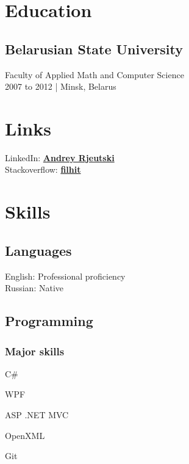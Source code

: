 \documentclass[a4paper,11pt]{article}
\newcommand{\periodandlocation}[1]{{\small #1}}
\begin{document}
  \vspace{1cm}
  \begin{minipage}[t]{0.34\textwidth}
    \section*{Education} 
    \subsection*{Belarusian State University}
    Faculty of Applied Math and Computer Science\\
	\periodandlocation{2007 to 2012 | Minsk, Belarus}
    \section*{Links} 
    LinkedIn: \href{https://linkedin.com/in/andrey-rjeutski-92064741}{\bf Andrey Rjeutski} \\
    Stackoverflow: \href{http://stackoverflow.com/users/3506292/filhit}{\bf filhit}
    \section*{Skills}
	\subsection*{Languages}
    English: Professional proficiency\\
    Russian: Native
    \subsection*{Programming}
    \subsubsection*{Major skills}
	\begin{inparaitem}
      \item C\# 
	  \item WPF
	  \item ASP .NET MVC
	  \item OpenXML
	  \item Git
	\end{inparaitem}

\end{minipage}
\end{document}
